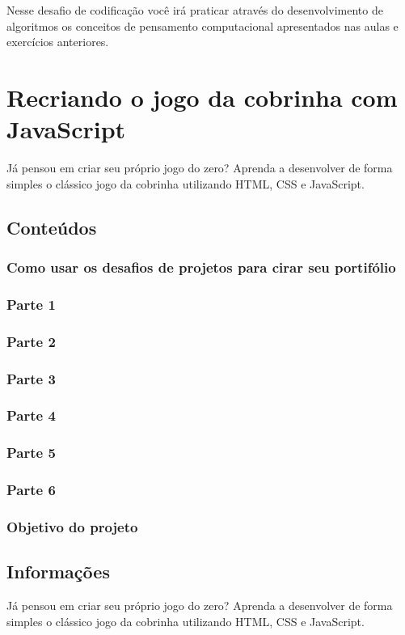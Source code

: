 \documentclass[12pt,a4paper]{article}
\begin{document}
	Nesse desafio de codificação você irá praticar através do desenvolvimento de algoritmos os conceitos de pensamento computacional apresentados nas aulas e exercícios anteriores.
	
	\section{Recriando o jogo da cobrinha com JavaScript}
	
	Já pensou em criar seu próprio jogo do zero? Aprenda a desenvolver de forma simples o clássico jogo da cobrinha utilizando HTML, CSS e JavaScript.
	
	\subsection{Conteúdos}
	\subsubsection{Como usar os desafios de projetos para cirar seu portifólio}
	
	\subsubsection{Parte 1}
	
	\subsubsection{Parte 2}
	
	\subsubsection{Parte 3}
	
	\subsubsection{Parte 4}
	
	\subsubsection{Parte 5}
	
	\subsubsection{Parte 6}
	
	\subsubsection{Objetivo do projeto}
	
	\subsection{Informações}
	
	Já pensou em criar seu próprio jogo do zero? Aprenda a desenvolver de forma simples o clássico jogo da cobrinha utilizando HTML, CSS e JavaScript.
	
\end{document}
